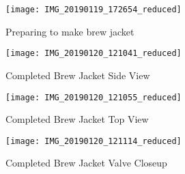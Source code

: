 \begin{figure}[H]
  \centering
  \texttt{[image: IMG\_20190119\_172654\_reduced]}
  \caption{Preparing to make brew jacket}\label{fig:brewjacket:prep}
\end{figure}

\begin{figure}[H]
  \centering
  \texttt{[image: IMG\_20190120\_121041\_reduced]}
  \caption{Completed Brew Jacket Side View}\label{fig:brewjacket:side}
\end{figure}

\begin{figure}[H]
  \centering
  \texttt{[image: IMG\_20190120\_121055\_reduced]}
  \caption{Completed Brew Jacket Top View}\label{fig:brewjacket:top}
\end{figure}

\begin{figure}[H]
  \centering
  \texttt{[image: IMG\_20190120\_121114\_reduced]}
  \caption{Completed Brew Jacket Valve Closeup}\label{fig:brewjacket:valve}
\end{figure}

\def\todaysdate{20190126}
\newday{\todaysdate}\label{\todaysdate}


